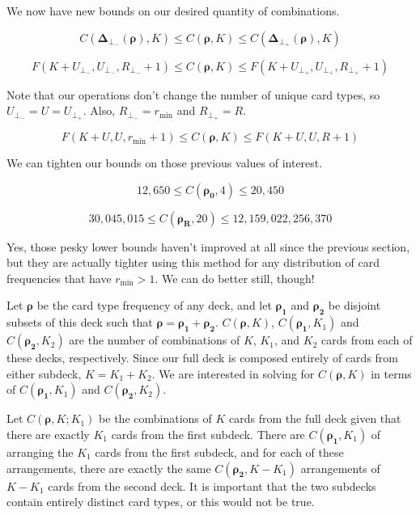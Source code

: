 \documentclass{article}
\begin{document}
We now have new bounds on our desired quantity of combinations.

\begin{equation}
    C(\bm{\Delta_{\bot_-}}(\bm{\rho}), K) \leq C(\bm{\rho}, K) \leq C(\bm{\Delta_{\bot_+}}(\bm{\rho}), K)
\end{equation}

\begin{equation}
    F(K + U_{\bot_-}, U_{\bot_-}, R_{\bot_-} + 1) \leq C(\bm{\rho}, K) \leq F(K + U_{\bot_+}, U_{\bot_+}, R_{\bot_+} + 1)
\end{equation}

Note that our operations don't change the number of unique card types, so $U_{\bot_-} = U = U_{\bot_+}$. Also, $R_{\bot_-} = r_{\min}$ and $R_{\bot_+} = R$.

\begin{equation}
    F(K + U, U, r_{\min} + 1) \leq C(\bm{\rho}, K) \leq F(K + U, U, R + 1)
\end{equation}

We can tighten our bounds on those previous values of interest.

\begin{equation}
    12,650 \leq C(\bm{\rho_0}, 4) \leq 20,450
\end{equation}

\begin{equation}
    30,045,015 \leq C(\bm{\rho_R}, 20) \leq 12,159,022,256,370
\end{equation}

Yes, those pesky lower bounds haven't improved at all since the previous section, but they are actually tighter using this method for any distribution of card frequencies that have $r_{\min}>1$. We can do better still, though!



Let $\bm{\rho}$ be the card type frequency of any deck, and let $\bm{\rho_1}$ and $\bm{\rho_2}$ be disjoint subsets of this deck such that $\bm{\rho} = \bm{\rho_1} + \bm{\rho_2}$. $C(\bm{\rho}, K)$, $C(\bm{\rho_1}, K_1)$ and $C(\bm{\rho_2}, K_2)$ are the number of combinations of $K$, $K_1$, and $K_2$ cards from each of these decks, respectively. Since our full deck is composed entirely of cards from either subdeck, $K = K_1 + K_2$. We are interested in solving for $C(\bm{\rho}, K)$ in terms of $C(\bm{\rho_1}, K_1)$ and $C(\bm{\rho_2}, K_2)$. 

Let $C(\bm{\rho}, K; K_1)$ be the combinations of $K$ cards from the full deck given that there are exactly $K_1$ cards from the first subdeck. There are $C(\bm{\rho_1}, K_1)$ of arranging the $K_1$ cards from the first subdeck, and for each of these arrangements, there are exactly the same $C(\bm{\rho_2}, K - K_1)$ arrangements of $K - K_1$ cards from the second deck. It is important that the two subdecks contain entirely distinct card types, or this would not be true.
\end{document}
